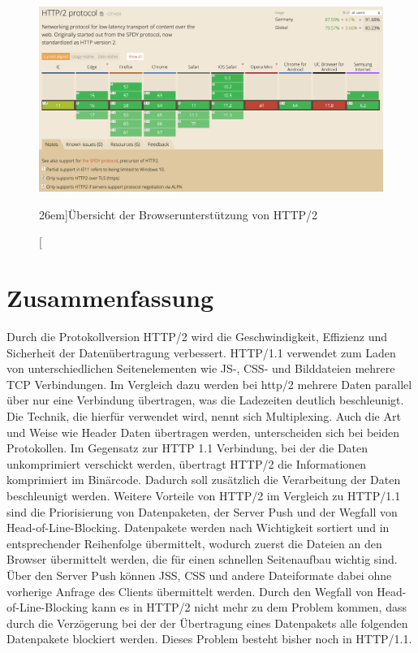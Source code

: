 \documentclass[a4paper, justified, notoc]{tufte-handout} %
\begin{document}
\begin{figure}%
	\centering
  \includegraphics[width=1.55\textwidth]{./figures/http2_browser_support.png}
  \caption[][26em]{Übersicht der Browserunterstützung von HTTP/2}
  \label{fig:http2_browser_support}
\end{figure}










\section{Zusammenfassung} %
\label{sec:zusammenfassung}
Durch die Protokollversion HTTP/2 wird die Geschwindigkeit, Effizienz und Sicherheit der Datenübertragung verbessert. HTTP/1.1 verwendet zum Laden von unterschiedlichen Seitenelementen wie JS-, CSS- und Bilddateien mehrere TCP Verbindungen. Im Vergleich dazu werden bei http/2 mehrere Daten parallel über nur eine Verbindung übertragen, was die Ladezeiten deutlich beschleunigt. Die Technik, die hierfür verwendet wird, nennt sich Multiplexing. Auch die Art und Weise wie Header Daten übertragen werden, unterscheiden sich bei beiden Protokollen. Im Gegensatz zur HTTP 1.1 Verbindung, bei der die Daten unkomprimiert verschickt werden, übertragt HTTP/2 die Informationen komprimiert im Binärcode. Dadurch soll zusätzlich die Verarbeitung der Daten beschleunigt werden. Weitere Vorteile von HTTP/2 im Vergleich zu HTTP/1.1 sind die Priorisierung von Datenpaketen, der Server Push und der Wegfall von Head-of-Line-Blocking. Datenpakete werden nach Wichtigkeit sortiert und in entsprechender Reihenfolge übermittelt, wodurch zuerst die Dateien an den Browser übermittelt werden, die für einen schnellen Seitenaufbau wichtig sind. Über den Server Push können JSS, CSS und andere Dateiformate dabei ohne vorherige Anfrage des Clients übermittelt werden. Durch den Wegfall von Head-of-Line-Blocking kann es in HTTP/2 nicht mehr zu dem Problem kommen, dass durch die Verzögerung bei der der Übertragung eines Datenpakets alle folgenden Datenpakete blockiert werden. Dieses Problem besteht bisher noch in HTTP/1.1.



\newpage

\end{document}

